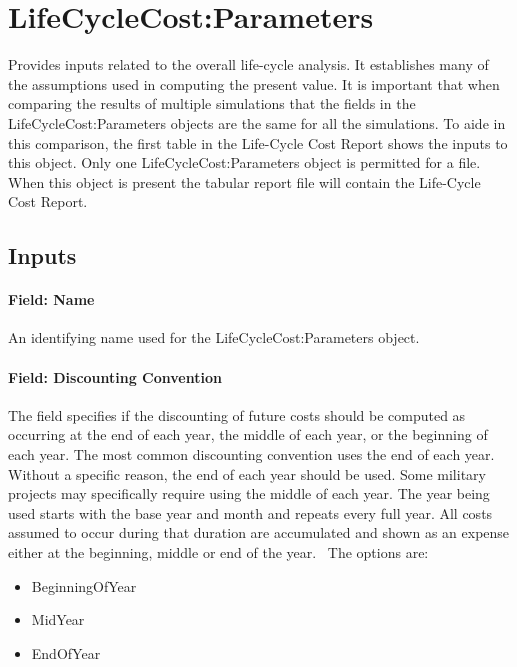 \section{LifeCycleCost:Parameters}\label{lifecyclecostparameters}

Provides inputs related to the overall life-cycle analysis. It establishes many of the assumptions used in computing the present value. It is important that when comparing the results of multiple simulations that the fields in the LifeCycleCost:Parameters objects are the same for all the simulations. To aide in this comparison, the first table in the Life-Cycle Cost Report shows the inputs to this object. Only one LifeCycleCost:Parameters object is permitted for a file. When this object is present the tabular report file will contain the Life-Cycle Cost Report.

\subsection{Inputs}\label{inputs-058}

\paragraph{Field: Name}\label{field-name-056}

An identifying name used for the LifeCycleCost:Parameters object.

\paragraph{Field: Discounting Convention}\label{field-discounting-convention}

The field specifies if the discounting of future costs should be computed as occurring at the end of each year, the middle of each year, or the beginning of each year. The most common discounting convention uses the end of each year. Without a specific reason, the end of each year should be used. Some military projects may specifically require using the middle of each year. The year being used starts with the base year and month and repeats every full year. All costs assumed to occur during that duration are accumulated and shown as an expense either at the beginning, middle or end of the year.~ The options are:

\begin{itemize}
\item
  BeginningOfYear
\item
  MidYear
\item
  EndOfYear
\end{itemize}

